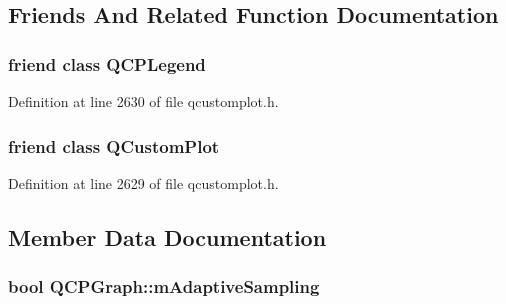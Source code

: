 \subsection{Friends And Related Function Documentation}
\hypertarget{class_q_c_p_graph_a8429035e7adfbd7f05805a6530ad5e3b}{}
\subsubsection[{Q\+C\+P\+Legend}]{\setlength{\rightskip}{0pt plus 5cm}friend class {\bf Q\+C\+P\+Legend}\hspace{0.3cm}{\ttfamily [friend]}}\label{class_q_c_p_graph_a8429035e7adfbd7f05805a6530ad5e3b}


Definition at line 2630 of file qcustomplot.\+h.

\hypertarget{class_q_c_p_graph_a1cdf9df76adcfae45261690aa0ca2198}{}
\subsubsection[{Q\+Custom\+Plot}]{\setlength{\rightskip}{0pt plus 5cm}friend class {\bf Q\+Custom\+Plot}\hspace{0.3cm}{\ttfamily [friend]}}\label{class_q_c_p_graph_a1cdf9df76adcfae45261690aa0ca2198}


Definition at line 2629 of file qcustomplot.\+h.



\subsection{Member Data Documentation}
\hypertarget{class_q_c_p_graph_aa951e78aeba714cf443be6da2e52502e}{}
\subsubsection[{m\+Adaptive\+Sampling}]{\setlength{\rightskip}{0pt plus 5cm}bool Q\+C\+P\+Graph\+::m\+Adaptive\+Sampling\hspace{0.3cm}{\ttfamily [protected]}}\label{class_q_c_p_graph_aa951e78aeba714cf443be6da2e52502e}


